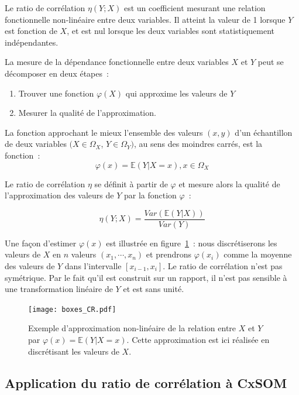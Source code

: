 \documentclass[../main]{subfiles}
\begin{document}
Le ratio de corrélation $\eta(Y;X)$ est un coefficient mesurant une relation fonctionnelle non-linéaire entre deux variables. Il atteint la valeur de 1 lorsque $Y$ est fonction de $X$, et est nul lorsque les deux variables sont statistiquement indépendantes.

La mesure de la dépendance fonctionnelle entre deux variables $X$ et $Y$ peut se décomposer en deux étapes~:
\begin{enumerate}
    \item Trouver une fonction $\varphi(X)$ qui approxime les valeurs de $Y$
    \item Mesurer la qualité de l'approximation.
\end{enumerate}

La fonction approchant le mieux l'ensemble des valeurs $(x,y)$ d'un échantillon de deux variables $(X \in \Omega_X$, $Y \in \Omega_Y)$, au sens des moindres carrés, est la fonction~:
\begin{equation}
    \varphi(x) = \mathbb{E}(Y|X = x), x \in \Omega_X
\end{equation}

Le ratio de corrélation $\eta$ se définit à partir de $\varphi$ et mesure alors la qualité de l'approximation des valeurs de $Y$ par la fonction $\varphi$~:

\begin{equation}\label{eq:cr}
   \eta(Y;X) = \frac{Var(\mathbb{E}(Y|X))}{Var(Y)}
\end{equation}

Une façon d'estimer $\varphi(x)$ est illustrée en figure~\ref{fig:cr_box}~: nous discrétiserons les valeurs de $X$ en $n$ valeurs $(x_1, \cdots, x_n)$ et prendrons $\varphi(x_i)$ comme la moyenne des valeurs de $Y$ dans l'intervalle $[x_{i-1}, x_i]$.
Le ratio de corrélation n'est pas symétrique. Par le fait qu'il est construit sur un rapport, il n'est pas sensible à une transformation linéaire de $Y$ et est sans unité.

\begin{figure}
    \centering
    \texttt{[image: boxes\_CR.pdf]}
    \caption{Exemple d'approximation non-linéaire de la relation entre $X$ et $Y$ par $\varphi(x)= \mathbb{E}(Y|X=x)$. Cette approximation est ici réalisée en discrétisant les valeurs de $X$. \label{fig:cr_box}}
\end{figure}

\subsection{Application du ratio de corrélation à CxSOM}
\end{document}
